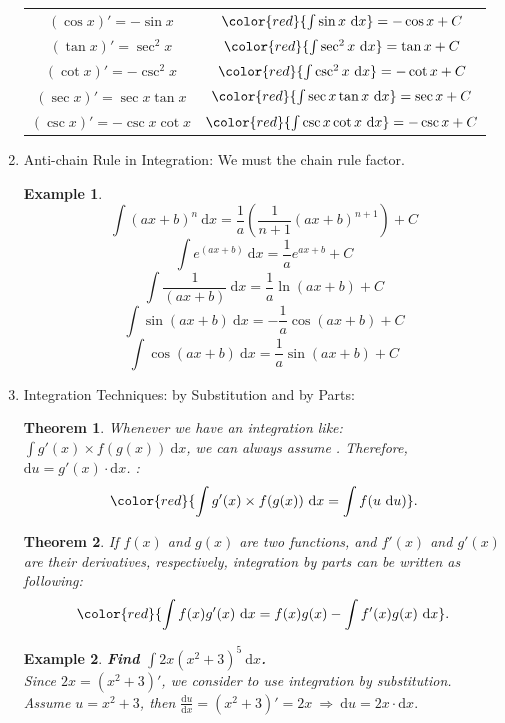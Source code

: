 \documentclass[12pt, a4paper]{article}
\newtheorem{theorem}{Theorem}[subsection]
\newtheorem{example}{Example}[subsection]
\begin{document}
\begin{enumerate}
\begin{center}
\begin{tabular}{c|c}
        $(\cos x)'=-\sin x$&${\color{red}{\int \sin x\ \mathrm{d}x}=-\cos x+C}$\\
        $(\tan x)'=\sec^2 x$&${\color{red}{\int \sec^2 x\ \mathrm{d}x}=\tan x+C}$\\
        $(\cot x)'=-\csc^2 x$&${\color{red}{\int \csc^2 x\ \mathrm{d}x}=-\cot x+C}$\\
        $(\sec x)'=\sec x\tan x$&${\color{red}{\int \sec x\tan x\ \mathrm{d}x}=\sec x+C}$\\
        $(\csc x)'=-\csc x\cot x$&${\color{red}{\int \csc x\cot x\ \mathrm{d}x}=-\csc x+C}$\\
    \end{tabular}\end{center}
    \item Anti-chain Rule in Integration: We must {\color{red}{divide}} the chain rule factor.
    \begin{example}
        $$\int (ax+b)^n\ \mathrm{d}x=\frac{1}{a}\left(\frac{1}{n+1}(ax+b)^{n+1}\right)+C$$
        $$\int e^{(ax+b)}\ \mathrm{d}x=\frac{1}{a}e^{ax+b}+C$$
        $$\int \frac{1}{(ax+b)}\ \mathrm{d}x=\frac{1}{a}\ln(ax+b)+C$$
        $$\int \sin{(ax+b)}\ \mathrm{d}x=-\frac{1}{a}\cos(ax+b)+C$$
        $$\int \cos{(ax+b)}\ \mathrm{d}x=\frac{1}{a}\sin(ax+b)+C$$
    \end{example}
    \item Integration Techniques: by Substitution and by Parts: 
    \begin{theorem}
        Whenever we have an integration like: $\int g'(x)\times f(g(x))\ \mathrm{d}x$, we can always assume {\color{red}{$u=g(x)$}}. Therefore, $\mathrm{d}u=g'(x)\cdot\mathrm{d}x$. {}: 
        $${\color{red}{\int g'(x)\times f(g(x))\ \mathrm{d}x=\int f(u\ \mathrm{d}u)}}.$$
    \end{theorem}
    \begin{theorem}
        If $f(x)$ and $g(x)$ are two functions, and $f'(x)$ and $g'(x)$ are their derivatives, respectively, integration by parts can be written as following:         $${\color{red}{\int f(x)g'(x)\ \mathrm{d}x=f(x)g(x)-\int f'(x)g(x)\ \mathrm{d}x}}.$$
    \end{theorem}
    \begin{example}
        \textbf{Find $\int 2x(x^2+3)^5\ \mathrm{d}x$.}\\
        Since $2x=(x^2+3)'$, we consider to use integration by substitution. \\
        Assume $u=x^2+3$, then $\frac{\mathrm{d}u}{\mathrm{d}x}=(x^2+3)'=2x\ \Rightarrow\ \mathrm{d}u=2x\cdot \mathrm{d}x.$

\end{example}
\end{enumerate}
\end{document}
